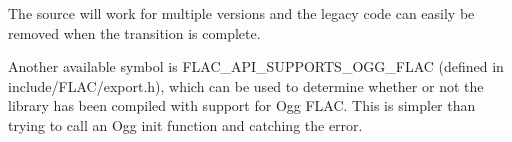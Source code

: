 \begin{DoxyCode}{0}
\DoxyCodeLine{\textcolor{preprocessor}{\#if !defined(FLAC\_API\_VERSION\_CURRENT) || FLAC\_API\_VERSION\_CURRENT <= 7}}
\DoxyCodeLine{\textcolor{preprocessor}{\#else}}
\DoxyCodeLine{\textcolor{preprocessor}{\#endif}}
\end{DoxyCode}


The source will work for multiple versions and the legacy code can easily be removed when the transition is complete.

Another available symbol is F\+L\+A\+C\+\_\+\+A\+P\+I\+\_\+\+S\+U\+P\+P\+O\+R\+T\+S\+\_\+\+O\+G\+G\+\_\+\+F\+L\+AC (defined in include/\+F\+L\+A\+C/export.\+h), which can be used to determine whether or not the library has been compiled with support for Ogg F\+L\+AC. This is simpler than trying to call an Ogg init function and catching the error. 